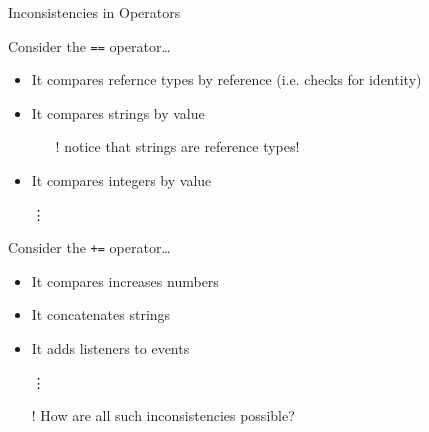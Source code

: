 \documentclass[presentation]{beamer}
\begin{document}
\begin{frame}{Inconsistencies in \csharp Operators}
  \begin{block}{Consider the \texttt{==} operator\ldots}
    \begin{itemize}
      \item It compares refernce types by reference (i.e. checks for identity)
      \item It compares strings by value
      \begin{itemize}
        \item[!] notice that strings are reference types!
      \end{itemize}
      \item It compares integers by value
      \item[\vdots] 
    \end{itemize}
  \end{block}

  \begin{block}{Consider the \texttt{+=} operator\ldots}
    \begin{itemize}
      \item It compares increases numbers
      \item It concatenates strings
      \item It adds listeners to events
      \item[\vdots] 
    \end{itemize}
  \end{block}

  \begin{itemize}
    \item[!] How are all such inconsistencies possible?
  \end{itemize}
\end{frame}
\end{document}
